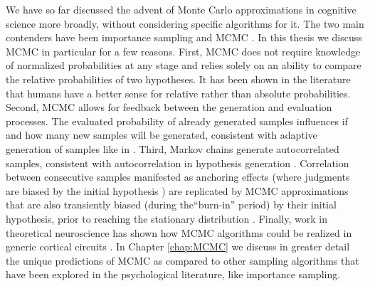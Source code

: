 We have so far discussed the advent of Monte Carlo approximations in cognitive science more broadly, without considering specific algorithms for it. The two main contenders have been importance sampling \cite{shi10} and MCMC \cite{Lieder2013}. In this thesis we discuss MCMC in particular for a few reasons. First, MCMC does not require knowledge of normalized probabilities at any stage and relies solely on an ability to compare the relative probabilities of two hypotheses. It has been shown in the literature \citep{stewart06} that humans have a better sense for relative rather than absolute probabilities. Second, MCMC allows for feedback between the generation and evaluation processes. The evaluated probability of already generated samples influences if and how many new samples will be generated, consistent with adaptive generation of samples like in \citet{hamrick2015think}. Third, Markov chains generate autocorrelated samples, consistent with autocorrelation in hypothesis generation \citep{multistability,vul08,Bonawitz2014}. Correlation between consecutive samples manifested as anchoring effects (where judgments are biased by the initial hypothesis \citep{tversky}) are replicated by MCMC approximations that are also transiently biased (during the``burn-in'' period) by their initial hypothesis, prior to reaching the stationary distribution \citep{Lieder2013}. Finally, work in theoretical neuroscience has shown how MCMC algorithms could be realized in generic cortical circuits \citep{buesing11,pecevski11,Moreno11,bernstein2017markov}. In Chapter \ref{chap:MCMC} we discuss in greater detail the unique predictions of MCMC as compared to other sampling algorithms that have been explored in the psychological literature, like importance sampling.
%
%
